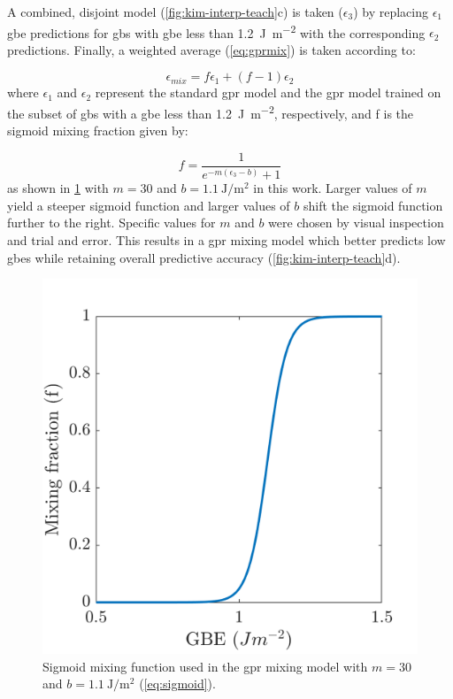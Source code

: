 \documentclass[preprint,12pt]{elsarticle}
\newcommand{\thr}{\SI{1.2}{\joule\per\square\meter}}
\newcommand{\sigthr}{\SI{1.1}{\joule\per\square\meter}}
\begin{document}
A combined, disjoint model (\cref{fig:kim-interp-teach}c) is taken ($\epsilon_3$) by replacing $\epsilon_1$ \gls{gbe} predictions for \glspl{gb} with \gls{gbe} less than \thr{} with the corresponding $\epsilon_2$ predictions. Finally, a weighted average (\cref{eq:gprmix}) is taken according to:

\begin{equation}
    \epsilon_{mix} = f \epsilon_1+(f-1) \epsilon_2
    \label{eq:gprmix}
\end{equation}
where $\epsilon_1$ and $\epsilon_2$ represent the standard \gls{gpr} model and the \gls{gpr} model trained on the subset of \glspl{gb} with a \gls{gbe} less than \thr{}, respectively, and f is the sigmoid mixing fraction given by:

\begin{equation}
    f=\frac{1}{e^{-m \left(\epsilon_3-b\right)}+1}
    \label{eq:sigmoid}
\end{equation}
as shown in \cref{fig:gprmix-sigmoid} with $m=30$ and $b=\sigthr{}$ in this work. Larger values of $m$ yield a steeper sigmoid function and larger values of $b$ shift the sigmoid function further to the right. Specific values for $m$ and $b$ were chosen by visual inspection and trial and error. This results in a \gls{gpr} mixing model which better predicts low \glspl{gbe} while retaining overall predictive accuracy (\cref{fig:kim-interp-teach}d).

\begin{figure}
    \centering
    \includegraphics{figures/gprmix-sigmoid.png}
    \caption{Sigmoid mixing function used in the \gls{gpr} mixing model with $m=30$ and $b=\sigthr{}$ (\cref{eq:sigmoid}).}
    \label{fig:gprmix-sigmoid}
\end{figure}
\end{document}
